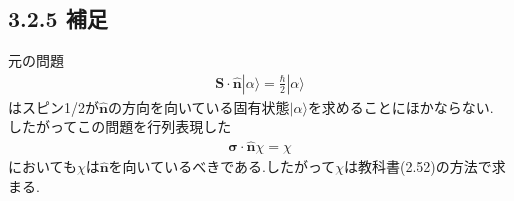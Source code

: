 \documentclass[uplatex,a4j,11pt,dvipdfmx]{jsarticle}
\begin{document}
\subsection*{3.2.5 補足}
元の問題
\begin{align}
  {\bm S}\cdot\hat{\bm n}|\alpha\rangle=\frac{\hbar}{2}|\alpha\rangle
\end{align}
はスピン1/2が$\hat{\bm n}$の方向を向いている固有状態$|\alpha\rangle$を求めることにほかならない.
したがってこの問題を行列表現した
\begin{align}
  {\bm \sigma}\cdot\hat{\bm n}\chi=\chi
\end{align}
においても$\chi$は$\hat{\bm n}$を向いているべきである.したがって$\chi$は教科書(2.52)の方法で求まる.

\end{document}
